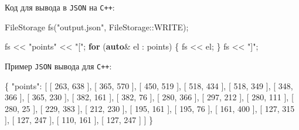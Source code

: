 \documentclass[
  12pt,
  a4paper,
]{article}
\newenvironment{Shaded}{}{}
\newcommand{\ControlFlowTok}[1]{\textcolor[rgb]{0.00,0.44,0.13}{\textbf{#1}}}
\newcommand{\DataTypeTok}[1]{\textcolor[rgb]{0.56,0.13,0.00}{#1}}
\newcommand{\DecValTok}[1]{\textcolor[rgb]{0.25,0.63,0.44}{#1}}
\newcommand{\FunctionTok}[1]{\textcolor[rgb]{0.02,0.16,0.49}{#1}}
\newcommand{\KeywordTok}[1]{\textcolor[rgb]{0.00,0.44,0.13}{\textbf{#1}}}
\newcommand{\NormalTok}[1]{#1}
\newcommand{\OperatorTok}[1]{\textcolor[rgb]{0.40,0.40,0.40}{#1}}
\newcommand{\OtherTok}[1]{\textcolor[rgb]{0.00,0.44,0.13}{#1}}
\newcommand{\StringTok}[1]{\textcolor[rgb]{0.25,0.44,0.63}{#1}}
\begin{document}
Код для вывода в \texttt{JSON} на \texttt{C++}:

\begin{Shaded}
\begin{Highlighting}[]
\NormalTok{    FileStorage fs}\OperatorTok{(}\StringTok{"output.json"}\OperatorTok{,}\NormalTok{ FileStorage}\OperatorTok{::}\NormalTok{WRITE}\OperatorTok{);}

\NormalTok{    fs }\OperatorTok{\textless{}\textless{}} \StringTok{"points"} \OperatorTok{\textless{}\textless{}} \StringTok{"["}\OperatorTok{;}
    \ControlFlowTok{for} \OperatorTok{(}\KeywordTok{auto}\OperatorTok{\&}\NormalTok{ el }\OperatorTok{:}\NormalTok{ points}\OperatorTok{)} \OperatorTok{\{}
\NormalTok{        fs }\OperatorTok{\textless{}\textless{}}\NormalTok{ el}\OperatorTok{;}
    \OperatorTok{\}}
\NormalTok{    fs }\OperatorTok{\textless{}\textless{}} \StringTok{"]"}\OperatorTok{;}
\end{Highlighting}
\end{Shaded}

Пример \texttt{JSON} вывода для \texttt{C++}:

\begin{Shaded}
\begin{Highlighting}[]
\FunctionTok{\{}
    \DataTypeTok{"points"}\FunctionTok{:} \OtherTok{[}
        \OtherTok{[} \DecValTok{263}\OtherTok{,} \DecValTok{638} \OtherTok{],}
        \OtherTok{[} \DecValTok{365}\OtherTok{,} \DecValTok{570} \OtherTok{],}
        \OtherTok{[} \DecValTok{450}\OtherTok{,} \DecValTok{519} \OtherTok{],}
        \OtherTok{[} \DecValTok{518}\OtherTok{,} \DecValTok{434} \OtherTok{],}
        \OtherTok{[} \DecValTok{518}\OtherTok{,} \DecValTok{349} \OtherTok{],}
        \OtherTok{[} \DecValTok{348}\OtherTok{,} \DecValTok{366} \OtherTok{],}
        \OtherTok{[} \DecValTok{365}\OtherTok{,} \DecValTok{230} \OtherTok{],}
        \OtherTok{[} \DecValTok{382}\OtherTok{,} \DecValTok{161} \OtherTok{],}
        \OtherTok{[} \DecValTok{382}\OtherTok{,} \DecValTok{76} \OtherTok{],}
        \OtherTok{[} \DecValTok{280}\OtherTok{,} \DecValTok{366} \OtherTok{],}
        \OtherTok{[} \DecValTok{297}\OtherTok{,} \DecValTok{212} \OtherTok{],}
        \OtherTok{[} \DecValTok{280}\OtherTok{,} \DecValTok{111} \OtherTok{],}
        \OtherTok{[} \DecValTok{280}\OtherTok{,} \DecValTok{25} \OtherTok{],}
        \OtherTok{[} \DecValTok{229}\OtherTok{,} \DecValTok{383} \OtherTok{],}
        \OtherTok{[} \DecValTok{212}\OtherTok{,} \DecValTok{230} \OtherTok{],}
        \OtherTok{[} \DecValTok{195}\OtherTok{,} \DecValTok{161} \OtherTok{],}
        \OtherTok{[} \DecValTok{195}\OtherTok{,} \DecValTok{76} \OtherTok{],}
        \OtherTok{[} \DecValTok{161}\OtherTok{,} \DecValTok{400} \OtherTok{],}
        \OtherTok{[} \DecValTok{127}\OtherTok{,} \DecValTok{315} \OtherTok{],}
        \OtherTok{[} \DecValTok{127}\OtherTok{,} \DecValTok{247} \OtherTok{],}
        \OtherTok{[} \DecValTok{110}\OtherTok{,} \DecValTok{161} \OtherTok{],}
        \OtherTok{[} \DecValTok{127}\OtherTok{,} \DecValTok{247} \OtherTok{]}
    \OtherTok{]}
\FunctionTok{\}}
\end{Highlighting}
\end{Shaded}
\end{document}
